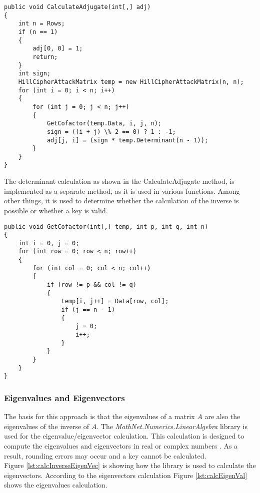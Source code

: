 \documentclass[conference]{IEEEtran}
\begin{document}
\begin{lstlisting}[caption={CalculateAdjugate method}, label={lst:calcAdj}]
public void CalculateAdjugate(int[,] adj)
{
    int n = Rows;
    if (n == 1)
    {
        adj[0, 0] = 1;
        return;
    }
    int sign;
    HillCipherAttackMatrix temp = new HillCipherAttackMatrix(n, n);
    for (int i = 0; i < n; i++)
    {
        for (int j = 0; j < n; j++)
        {
            GetCofactor(temp.Data, i, j, n);
            sign = ((i + j) \% 2 == 0) ? 1 : -1;
            adj[j, i] = (sign * temp.Determinant(n - 1));
        }
    }
}
\end{lstlisting}

The determinant calculation as shown in the CalculateAdjugate method, is implemented as a separate method, as it is used in various functions. Among other things, it is used to determine whether the calculation of the inverse is possible or whether a key is valid.

\begin{lstlisting}[caption={GetCofactor method}, label={lst:calcCofa}]
public void GetCofactor(int[,] temp, int p, int q, int n)
{
    int i = 0, j = 0;
    for (int row = 0; row < n; row++)
    {
        for (int col = 0; col < n; col++)
        {
            if (row != p && col != q)
            {
                temp[i, j++] = Data[row, col];
                if (j == n - 1)
                {
                    j = 0;
                    i++;
                }
            }
        }
    }
}
\end{lstlisting}

\subsubsection{Eigenvalues and Eigenvectors}
The basis for this approach is that the eigenvalues of a matrix \(A\) are also the eigenvalues of the inverse of \(A\). The \textit{MathNet.Numerics.LinearAlgebra} library is used for the eigenvalue/eigenvector calculation. This calculation is designed to compute the eigenvalues and eigenvectors in real or complex numbers \cite{b3}. As a result, rounding errors may occur and a key cannot be calculated.
\\
Figure \ref{lst:calcInverseEigenVec} is showing how the library is used to calculate the eigenvectors. According to the eigenvectors calculation Figure \ref{lst:calcEigenVal} shows the eigenvalues calculation.
\end{document}
